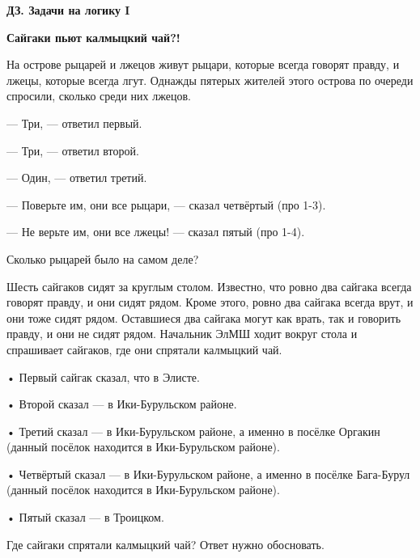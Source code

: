 \centerline{\bf \Huge ДЗ. Задачи на логику I}
\centerline{\bf \Huge }

\begin{flushright}
        \scriptsize{\textbf{Сайгаки пьют калмыцкий чай?!}}
\end{flushright}

 На острове рыцарей и лжецов живут рыцари, которые всегда
говорят правду, и лжецы, которые всегда лгут. Однажды пятерых жителей этого острова по
очереди спросили, сколько среди них лжецов.

— Три, — ответил первый.

— Три, — ответил второй.

— Один, — ответил третий.

— Поверьте им, они все рыцари, — сказал четвёртый (про 1-3).

— Не верьте им, они все лжецы! — сказал пятый (про 1-4).

Сколько рыцарей было на самом деле?


 Шесть сайгаков сидят за круглым столом. Известно, что ровно два
сайгака всегда говорят правду, и они сидят рядом. Кроме этого, ровно два сайгака всегда врут, и
они тоже сидят рядом. Оставшиеся два сайгака могут как врать, так и говорить правду, и они не
сидят рядом. Начальник ЭлМШ ходит вокруг стола и спрашивает сайгаков, где они спрятали калмыцкий чай.

• Первый сайгак сказал, что в Элисте.

• Второй сказал — в Ики-Бурульском районе.

• Третий сказал — в Ики-Бурульском районе, а именно в посёлке Оргакин (данный посёлок находится в Ики-Бурульском районе).

• Четвёртый сказал — в Ики-Бурульском районе, а именно в посёлке Бага-Бурул (данный посёлок находится в Ики-Бурульском районе).

• Пятый сказал — в Троицком.

Где сайгаки спрятали калмыцкий чай? Ответ нужно обосновать.


